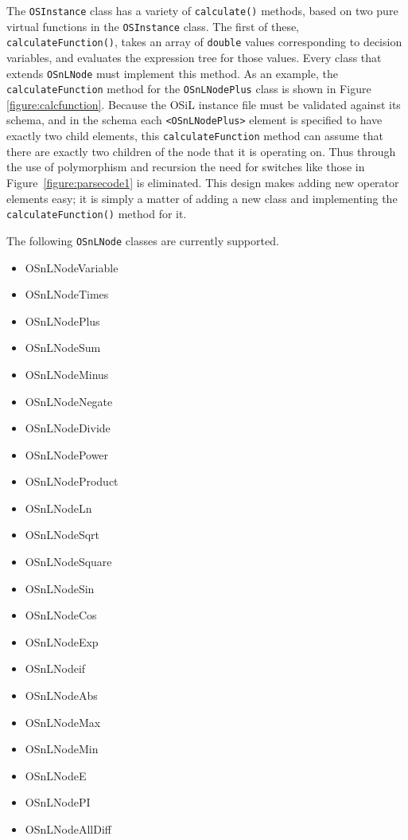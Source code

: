 \documentclass[11pt]{article}
\newcounter{Fig}
\renewcommand{\_}{{\char"5F}}
\renewcommand{\{}{{\char"7B}}
\renewcommand{\}}{{\char"7D}}
\renewcommand{\^}{{\char"0D}}
\renewcommand{\'}{{\char"0D}}
\begin{document}
    The {\tt OSInstance} class has a variety of {\tt calculate()} methods, based on two pure virtual functions in the {\tt OSInstance} class.  The first of these, {\tt calculateFunction()}, takes an array of {\tt double} values corresponding to decision variables, and evaluates the expression tree for those values.  Every class
that extends {\tt OSnLNode} must implement this method.  As an example, the {\tt calculateFunction} method for the {\tt OSnLNodePlus} class is shown in Figure \ref{figure:calcfunction}.  Because the OSiL instance file must be validated against its schema, and in the schema each {\tt <OSnLNodePlus>} element is specified to have exactly two child elements, this {\tt calculateFunction} method can assume that there are
exactly two children of the node that it is operating on.  Thus through the use of polymorphism and recursion the need for switches like those in Figure~\ref{figure:parsecode1} is eliminated. This design makes adding new operator elements easy; it is simply a matter of adding a new class and implementing the {\tt
calculateFunction()} method for it.



The following {\tt  OSnLNode} classes are currently supported.

\begin{itemize}
\item OSnLNodeVariable
\item OSnLNodeTimes 
\item OSnLNodePlus 
\item OSnLNodeSum 
\item OSnLNodeMinus 
\item OSnLNodeNegate
\item OSnLNodeDivide 
\item OSnLNodePower 
\item OSnLNodeProduct
\item OSnLNodeLn 
\item OSnLNodeSqrt 
\item OSnLNodeSquare
\item OSnLNodeSin
\item OSnLNodeCos
\item OSnLNodeExp
\item OSnLNodeif
\item OSnLNodeAbs
\item OSnLNodeMax
\item OSnLNodeMin
\item OSnLNodeE
\item OSnLNodePI
\item OSnLNodeAllDiff
\end{itemize}
\end{document}
